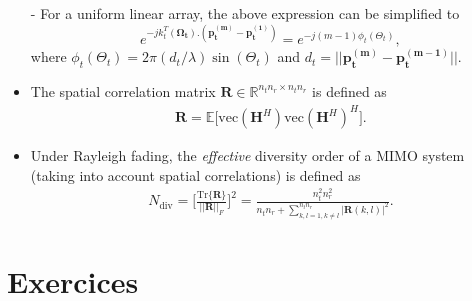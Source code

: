 \documentclass [a4paper, 11pt] {article}
\begin{document}
\begin{reminder}
\begin{itemize}
\begin{equation}
    \end{equation}
    \item[-] For a uniform linear array, the above expression can be simplified to
    \begin{equation}
    e^{-jk_t^T(\mathbf{\Omega_t}).(\mathbf{p^{(m)}_t} - \mathbf{p^{(1)}_t})} = e^{-j(m-1)\phi_t(\Theta_t)},
    \end{equation}
    where $\phi_t(\Theta_t) = 2\pi(d_t/\lambda)\sin(\Theta_t)$ and $d_t = ||\mathbf{p_t^{(m)}} - \mathbf{p_t^{(m-1)}}||$.
    \item The spatial correlation matrix $\mathbf{R} \in \mathbb{R}^{n_tn_r \times n_tn_r}$ is defined as
    \begin{align}
        \mathbf{R} = \mathbb{E}\Big[\text{vec}(\mathbf{H}^H)\text{vec}(\mathbf{H}^H)^H \Big].
    \end{align}
    \item Under Rayleigh fading, the \textit{effective} diversity order of a MIMO system (taking into account spatial correlations) is defined as
    \begin{align}
        N_{\text{div}} = \Bigg[ \frac{\text{Tr}\{\mathbf{R}\}}{||\mathbf{R}||_F}\Bigg]^2 = \frac{n_t^2n_r^2}{n_t n_r + \sum_{k,l=1,k \neq l}^{n_tn_r} |\mathbf{R}(k,l)|^2}.
    \end{align}



\end{itemize}
    \end{reminder}
    \part*{Exercices}
\end{document}
